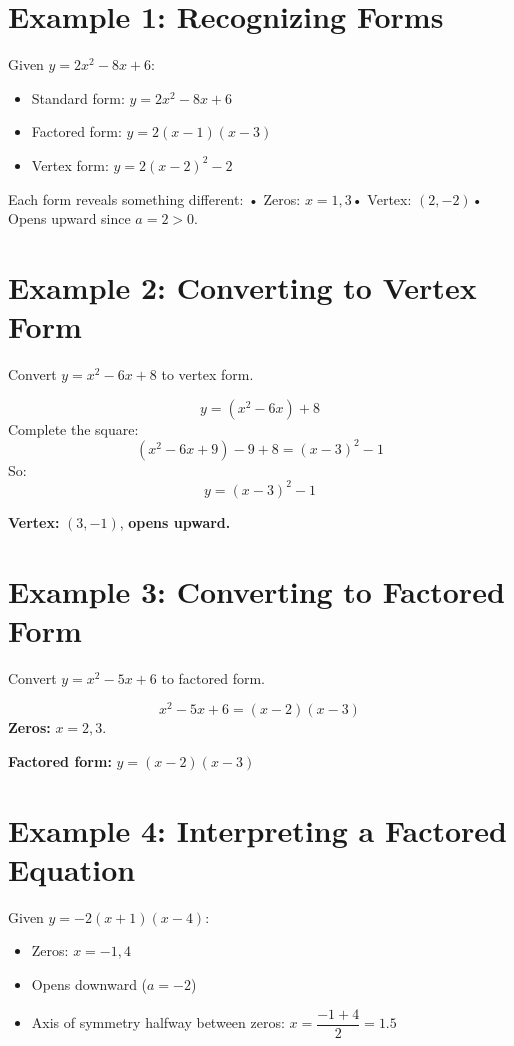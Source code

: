 \documentclass[12pt]{article}
\begin{document}
\section*{Example 1: Recognizing Forms}

Given \(y = 2x^2 - 8x + 6\):
\begin{itemize}
  \item Standard form: \(y = 2x^2 - 8x + 6\)
  \item Factored form: \(y = 2(x - 1)(x - 3)\)
  \item Vertex form: \(y = 2(x - 2)^2 - 2\)
\end{itemize}

Each form reveals something different:  
• Zeros: \(x = 1, 3\)• Vertex: \((2, -2)\)• Opens upward since \(a = 2 > 0\).

\section*{Example 2: Converting to Vertex Form}

Convert \(y = x^2 - 6x + 8\) to vertex form.

\[
y = (x^2 - 6x) + 8
\]
Complete the square:
\[
(x^2 - 6x + 9) - 9 + 8 = (x - 3)^2 - 1
\]
So:
\[
y = (x - 3)^2 - 1
\]

\textbf{Vertex:} \((3, -1)\), \textbf{opens upward.}

\section*{Example 3: Converting to Factored Form}

Convert \(y = x^2 - 5x + 6\) to factored form.

\[
x^2 - 5x + 6 = (x - 2)(x - 3)
\]
\textbf{Zeros:} \(x = 2, 3.\)

\textbf{Factored form:} \(\boxed{y = (x - 2)(x - 3)}\)

\section*{Example 4: Interpreting a Factored Equation}

Given \(y = -2(x + 1)(x - 4)\):
\begin{itemize}
  \item Zeros: \(x = -1, 4\)
  \item Opens downward (\(a = -2\))
  \item Axis of symmetry halfway between zeros: \(x = \dfrac{-1 + 4}{2} = 1.5\)
\end{itemize}
\end{document}
